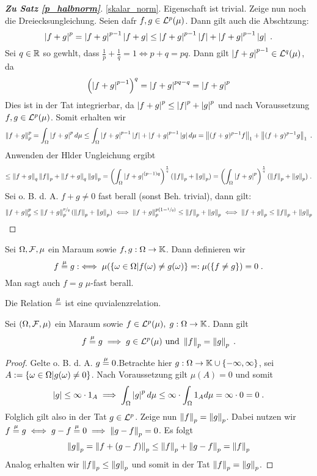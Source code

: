 \begin{proof}[\textbf{Zu Satz \ref{p_halbnorm}}]
	\ref{skalar_norm}. Eigenschaft ist trivial.
	Zeige nun noch die Dreiecksungleichung. Seien daf\us r \(f,g \in \mathcal{L}^p(\mu)\). Dann gilt auch die Absch\as tzung:
	\[\left\lvert f+g \right\rvert^p = \left\lvert f+g \right\rvert^{p-1} \left\lvert f+g \right\rvert \leq \left\lvert f+g \right\rvert^{p-1} \left\lvert f \right\rvert + \left\lvert f+g \right\rvert^{p-1} \left\lvert g \right\rvert  \;.\] 
	Sei \(q \in \mathbb{R}\) so gew\as hlt, dass \(\frac{1}{p} + \frac{1}{q} = 1 \iff p+q = pq\). Dann gilt \(\left\lvert f+g \right\rvert^{p-1} \in \mathcal{L}^q(\mu)\), da 
	\[\left(\left\lvert f+g \right\rvert^{p-1}\right)^q = \left\lvert f+g \right\rvert^{pq - q} = \left\lvert f+g \right\rvert^{p}\]
	Dies ist in der Tat integrierbar, da \(\left\lvert f+g \right\rvert^p \leq \left\lvert f \right\rvert^p + \left\lvert g \right\rvert^p\) und nach Voraussetzung \(f,g \in \mathcal{L}^p(\mu)\). Somit erhalten wir 
		\[\left\lVert f+g\right\rVert_{p}^p = \int_\Omega \left\lvert f+g \right\rvert^p  d\mu\leq  \int_\Omega  \left\lvert f+g \right\rvert^{p-1} \left\lvert f \right\rvert + \left\lvert f+g \right\rvert^{p-1} \left\lvert g \right\rvert d \mu = \left\lVert(f+g)^{p-1} f\right\rVert_{1} + \left\lVert(f+g)^{p-1} g\right\rVert_{1} \;.\]
		Anwenden der H\os lder Ungleichung ergibt
		\[\leq \left\lVert f+g\right\rVert_{q}\left\lVert f\right\rVert_{p} + \left\lVert f+g\right\rVert_{q}\left\lVert g\right\rVert_{p} = \left(\int_\Omega\left\lvert f+g \right\rvert^{(p-1)q}\right)^\frac{1}{q} (\left\lVert f\right\rVert_{p}+\left\lVert g\right\rVert_{p}) =  \left(\int_\Omega\left\lvert f+g \right\rvert^{p}\right)^\frac{1}{q} (\left\lVert f\right\rVert_{p}+\left\lVert g\right\rVert_{p})\;.\]
		Sei o. B. d. A. \(f+g \neq 0\) fast \us berall (sonst Beh. trivial), dann gilt: 
		\[\left\lVert f+g\right\rVert_{p}^p \leq \left\lVert f+g\right\rVert_{p}^{\sfrac{p}{q}}(\left\lVert f\right\rVert_{p}+\left\lVert g\right\rVert_{p}) \iff\left\lVert f+g\right\rVert_{p}^{p (1-\sfrac{1}{q})} \leq\left\lVert f\right\rVert_{p}+\left\lVert g\right\rVert_{p} \iff  \left\lVert f+g\right\rVert_{p} \leq \left\lVert f\right\rVert_{p}+\left\lVert g\right\rVert_{p}\]
\end{proof}

\begin{definition}
	Sei \(\Omega, \mathcal{F}, \mu\) ein Ma\s raum sowie \(f, g: \Omega \to \mathbb{K}\). Dann definieren wir
	\[f \overset{\mu}{=} g :\iff \mu(\left\{\omega \in \Omega\vert f(\omega) \neq g(\omega)\right\} =: \mu(\left\{f\neq g\right\}) = 0\;.\]
	Man sagt auch \(f = g\) $\mu$-fast \us berall.
\end{definition}
\begin{rem}
	Die Relation \(\overset{\mu}{=}\) ist eine \As quvialenzrelation.
\end{rem}
\begin{theorem}
	Sei \((\Omega, \mathcal{F}, \mu)\) ein Ma\s raum sowie \(f\in \mathcal{L}^p(\mu), \; g:\Omega \to \mathbb{K}\). Dann gilt
	\[f \overset{\mu}{=} g \implies g \in \mathcal{L}^p(\mu) \text{ und } \left\lVert f\right\rVert_{p} = \left\lVert g\right\rVert_{p}\;.\]
	\label{Lp_Norm_wohldef}
\end{theorem}
\begin{proof}
	Gelte o. B. d. A. \(g \overset{\mu}{=} 0\).Betrachte hier \(g:\Omega \to \mathbb{K} \cup\left\{-\infty, \infty\right\}\), sei \(A:=\left\{\omega \in \Omega\vert g(\omega) \neq 0\right\}\). Nach Voraussetzung gilt \(\mu(A) = 0\) und somit
	\[\left\lvert g \right\rvert \leq \infty \cdot 1_A \implies \int_\Omega \left\lvert g \right\rvert^p d\mu \leq \infty \cdot \int_\Omega 1_A d\mu = \infty\cdot 0 = 0\;.\]
	Folglich gilt also in der Tat \(g\in \mathcal{L}^p\). Zeige nun \(\left\lVert f\right\rVert_{p} = \left\lVert g\right\rVert_{p}\). Dabei nutzen wir \(f\overset{\mu}{=} g \iff g-f \overset{\mu}{=} 0 \implies \left\lVert g-f\right\rVert_{p} = 0\). Es folgt
	\[\left\lVert g\right\rVert_{p} = \left\lVert f+(g-f)\right\rVert_{p} \leq \left\lVert f\right\rVert_{p} + \left\lVert g-f\right\rVert_{p} = \left\lVert f\right\rVert_{p}\]
	Analog erhalten wir \(\left\lVert f\right\rVert_{p} \leq \left\lVert g\right\rVert_{p}\) und somit in der Tat \(\left\lVert f\right\rVert_{p} = \left\lVert g\right\rVert_{p}\).
\end{proof}

